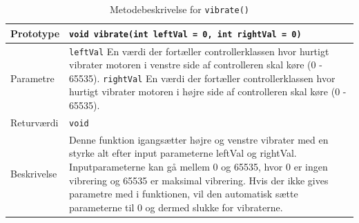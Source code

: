 \begin{table}[h]
\begin{tabularx}{\textwidth}{| L{2.5 cm} | Z |} \hline
Prototype 	& \texttt{void vibrate(int leftVal = 0, int rightVal = 0)} \\\hline
Parametre 	& \texttt{leftVal}			\newline En værdi der fortæller controllerklassen hvor hurtigt vibrater motoren i venstre side af controlleren skal køre (0 - 65535).	\newline \newline
			  \texttt{rightVal}			\newline En værdi der fortæller controllerklassen hvor hurtigt vibrater motoren i højre side af controlleren skal køre (0 - 65535). \\\hline
Returværdi	& \texttt{void} 			\newline \\\hline
Beskrivelse	&  Denne funktion igangsætter højre og venstre vibrater med en styrke alt efter input parameterne leftVal og rightVal. Inputparameterne kan gå mellem 0 og 65535, hvor 0 er ingen vibrering og 65535 er maksimal vibrering. Hvis der ikke gives parametre med i funktionen, vil den automatisk sætte parameterne til 0 og dermed slukke for vibraterne.\\\hline
\end{tabularx}
\caption{Metodebeskrivelse for \texttt{vibrate()}}
\label{table:met_vibrate}
\end{table}

